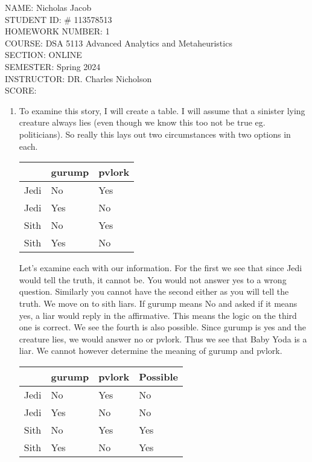 \documentclass[11pt]{article}
\author{}
\title{}
\begin{document}
{\Large
\noindent NAME:  Nicholas Jacob\\ 
STUDENT ID: \# 113578513\\
HOMEWORK NUMBER: 1\\
COURSE: DSA 5113 Advanced Analytics and Metaheuristics\\ 
SECTION: ONLINE\\SEMESTER: Spring 2024\\
INSTRUCTOR:  DR. Charles Nicholson\\
 SCORE:}

\newpage
\begin{enumerate}
\item To examine this story, I will create a table.  I will assume that a sinister lying creature always lies (even though we know this too not be true eg. politicians).  So really this lays out two circumstances with two options in each.  

\begin{tabular}{l|l|l}
&gurump&pvlork\\ \hline
Jedi&No& Yes\\
Jedi& Yes&No\\
Sith &No & Yes\\
Sith & Yes &No

\end{tabular}

Let's examine each with our information.  For the first we see that since Jedi would tell the truth, it cannot be.  You would not answer yes to a wrong question.  Similarly you cannot have the second either as you will tell the truth.  We move on to sith liars.  If gurump means No and asked if it means yes, a liar would reply in the affirmative.  This means the logic on the third one is correct.  We see the fourth is also possible.  Since gurump is yes and the creature lies, we would answer no or pvlork.  Thus we see that Baby Yoda is a liar.  We cannot however determine the meaning of gurump and pvlork.

\begin{tabular}{l|l|l|l}
&gurump&pvlork&Possible\\ \hline
Jedi&No& Yes& No\\
Jedi& Yes&No& No\\
Sith &No & Yes& Yes\\
Sith & Yes &No&Yes


\end{tabular}
\end{enumerate}
\end{document}
